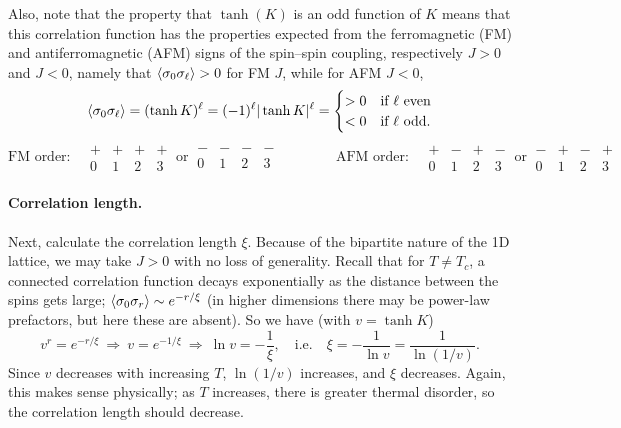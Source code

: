 Also, note that the property that $\tanh(K)$ is an odd function of $K$ means that this correlation function has the
properties expected from the ferromagnetic (FM) and antiferromagnetic (AFM) signs of the spin--spin coupling, respectively
$J>0$ and $J<0$, namely that $\langle \sigma_0\sigma_\ell\rangle>0$ for FM $J$, while for AFM $J<0$,
\begin{equation}
  \langle \sigma_0\sigma_\ell\rangle = (\tanh K)^\ell = (-1)^\ell|\tanh K|^\ell
  = \begin{cases} >0 & \text{if $\ell$ even}\\ <0 & \text{if $\ell$ odd.}\end{cases}
\end{equation}
\begin{equation*}
  \text{FM order:}\quad
  \begin{array}{cccc} + & + & + & +\\[-2pt] \scriptstyle 0 & \scriptstyle 1 & \scriptstyle 2 & \scriptstyle 3\end{array}
  \ \text{or}\
  \begin{array}{cccc} - & - & - & -\\[-2pt] \scriptstyle 0 & \scriptstyle 1 & \scriptstyle 2 & \scriptstyle 3\end{array}
  \qquad\qquad
  \text{AFM order:}\quad
  \begin{array}{cccc} + & - & + & -\\[-2pt] \scriptstyle 0 & \scriptstyle 1 & \scriptstyle 2 & \scriptstyle 3\end{array}
  \ \text{or}\
  \begin{array}{cccc} - & + & - & +\\[-2pt] \scriptstyle 0 & \scriptstyle 1 & \scriptstyle 2 & \scriptstyle 3\end{array}
\end{equation*}

\paragraph{Correlation length.}

Next, calculate the correlation length $\xi$. Because of the bipartite nature of the 1D lattice, we may take $J>0$ with no
loss of generality. Recall that for $T\ne T_c$, a connected correlation function decays exponentially as the distance
between the spins gets large; $\langle \sigma_0\sigma_r\rangle\sim e^{-r/\xi}$ (in higher dimensions there may be power-law
prefactors, but here these are absent). So we have (with $v = \tanh K$)
\begin{equation}
  v^r = e^{-r/\xi}\ \Rightarrow\ v = e^{-1/\xi}\ \Rightarrow\ \ln v = -\frac{1}{\xi},\quad\text{i.e.}\quad
  \xi = -\frac{1}{\ln v} = \frac{1}{\ln\left(1/v\right)} .
\end{equation}
Since $v$ decreases with increasing $T$, $\ln(1/v)$ increases, and $\xi$ decreases. Again, this makes sense physically; as
$T$ increases, there is greater thermal disorder, so the correlation length should decrease.

